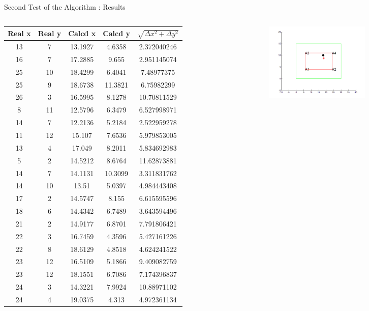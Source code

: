 \documentclass[utf8,compress]{beamer}
\begin{document}
\begin{frame}[containsverbatim]{Second Test of the Algorithm : Results   }
\begin{columns}
\begin{column}{0.5\textwidth}\tiny

\begin{tabular}{|c|c|c|c|c|}
\hline
	\textbf Real x & \textbf Real y & \textbf Calcd x & \textbf Calcd y & $\sqrt{\Delta x^2 + \Delta y^2} $ \\
\hline
\hline
13&	7&	13.1927&	4.6358&	2.372040246\\
16&	7&	17.2885&	9.655&	2.951145074\\
25&	10&	18.4299&	6.4041&	7.48977375\\
25&	9&	18.6738&	11.3821&	6.75982299\\
26&	3&	16.5995&	8.1278&	10.70811529\\
8&	11&	12.5796&	6.3479&	6.527998971\\
14&	7&	12.2136&	5.2184&	2.522959278\\
11&	12&	15.107&	7.6536&	5.979853005\\
13&	4&	17.049&	8.2011&	5.834692983\\
5&	2&	14.5212&	8.6764&	11.62873881\\
14&	7&	14.1131&	10.3099&	3.311831762\\
14&	10&	13.51&		5.0397&	4.984443408\\
17&	2&	14.5747&	8.155&	6.615595596\\
18&	6&	14.4342&	6.7489&	3.643594496\\
21&	2&	14.9177&	6.8701&	7.791806421\\
22&	3&	16.7459&	4.3596&	5.427161226\\
22&	8&	18.6129&	4.8518&	4.624241522\\
23&	12&	16.5109&	5.1866&	9.409082759\\
23&	12&	18.1551&	6.7086&	7.174396837\\
24&	3&	14.3221&	7.9924&	10.88971102\\
24&	4&	19.0375&	4.313&	4.972361134\\

\hline
\end{tabular}
\end{column}
\begin{column}{0.5\textwidth}
    \begin{figure}[h]
        \includegraphics[width=5cm]{t2rc.png}
    \end{figure}
\end{column}

\end{columns}

\end{frame}
\end{document}
